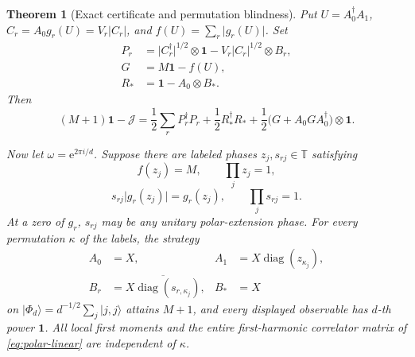 \documentclass[11pt]{article}
\newtheorem{theorem}{Theorem}[section]
\theoremstyle{remark}
\newcommand{\Id}{\mathbf 1}
\newcommand{\cJ}{\mathcal J}
\newcommand{\e}{\mathrm e}
\newcommand{\absop}[1]{\lvert #1\rvert}
\begin{document}
\begin{theorem}[Exact certificate and permutation blindness]
\label{thm:permutation}
Put \(U=A_0^\dagger A_1\),
\(C_r=A_0g_r(U)=V_r\absop{C_r}\), and
\(f(U)=\sum_r\absop{g_r(U)}\).  Set
\[
\begin{aligned}
P_r&=
\absop{C_r^\dagger}^{1/2}\otimes\Id
-V_r\absop{C_r}^{1/2}\otimes B_r,\\
G&=M\Id-f(U),\\
R_*&=\Id-A_0\otimes B_*.
\end{aligned}
\]
Then
\begin{equation}
\boxed{
(M+1)\Id-\cJ
=
\frac12\sum_rP_r^\dagger P_r
+\frac12R_*^\dagger R_*
+\frac12\bigl(G+A_0GA_0^\dagger\bigr)\otimes\Id .
}
\label{eq:polar-certificate}
\end{equation}

Now let \(\omega=\e^{2\pi i/d}\).  Suppose there are labeled phases
\(z_j,s_{rj}\in\mathbb T\) satisfying
\[
f(z_j)=M,\qquad
\prod_jz_j=1,
\]
\[
s_{rj}\absop{g_r(z_j)}=g_r(z_j),
\qquad
\prod_js_{rj}=1.
\]
At a zero of \(g_r\), \(s_{rj}\) may be any unitary polar-extension
phase.  For every permutation \(\kappa\) of the labels, the strategy
\begin{equation}
\begin{aligned}
A_0&=X,&
A_1&=X\operatorname{diag}(z_{\kappa_j}),\\
B_r&=\overline{
X\operatorname{diag}(s_{r,\kappa_j})},&
B_*&=X
\end{aligned}
\label{eq:permuted-strategy}
\end{equation}
on
\(\lvert\Phi_d\rangle=d^{-1/2}\sum_j\lvert j,j\rangle\)
attains \(M+1\), and every displayed observable has \(d\)-th power
\(\Id\).  All local first moments and the entire first-harmonic correlator
matrix of \eqref{eq:polar-linear} are independent of \(\kappa\).
\end{theorem}
\end{document}
